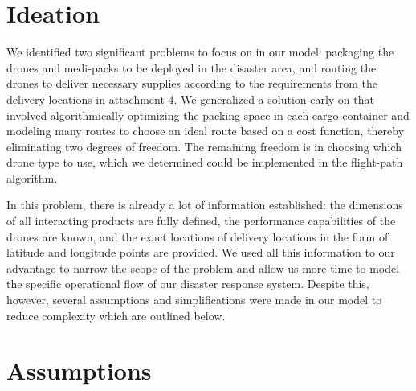 \documentclass[twocolumn,10pt]{asme2ej}
\begin{document}
\section{Ideation}
We identified two significant problems to focus on in our model: packaging the drones and medi-packs to be deployed in the disaster area, and routing the drones to deliver necessary supplies according to the requirements from the delivery locations in attachment 4. We generalized a solution early on that involved algorithmically optimizing the packing space in each cargo container and modeling many routes to choose an ideal route based on a cost function, thereby eliminating two degrees of freedom. The remaining freedom is in choosing which drone type to use, which we determined could be implemented in the flight-path algorithm.

In this problem, there is already a lot of information established: the dimensions of all interacting products are fully defined, the performance capabilities of the drones are known, and the exact locations of delivery locations in the form of latitude and longitude points are provided. We used all this information to our advantage to narrow the scope of the problem and allow us more time to model the specific operational flow of our disaster response system. Despite this, however, several assumptions and simplifications were made in our model to reduce complexity which are outlined below.

\section{Assumptions}
\end{document}
